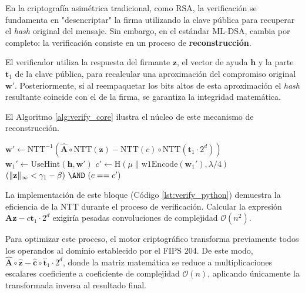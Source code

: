 \documentclass[11pt, a4paper]{report}
\theoremstyle{definition}
\begin{document}
En la criptografía asimétrica tradicional, como RSA, la verificación se fundamenta en "desencriptar" la firma utilizando la clave pública para recuperar el \textit{hash} original del mensaje. Sin embargo, en el estándar ML-DSA, cambia por completo: la verificación consiste en un proceso de \textbf{reconstrucción}.

El verificador utiliza la respuesta del firmante $\mathbf{z}$, el vector de ayuda $\mathbf{h}$ y la parte $\mathbf{t}_1$ de la clave pública, para recalcular una aproximación del compromiso original $\mathbf{w}'$. Posteriormente, si al reempaquetar los bits altos de esta aproximación el \textit{hash} resultante coincide con el de la firma, se garantiza la integridad matemática.

El Algoritmo \ref{alg:verify_core} ilustra el núcleo de este mecanismo de reconstrucción.

\begin{algorithm}[H]
\caption{Fragmento Algoritmo 8: Reconstrucción y Verificación}
\label{alg:verify_core}
\begin{algorithmic}[9]
\STATE $\mathbf{w}' \gets \text{NTT}^{-1}(\mathbf{\hat{A}} \circ \text{NTT}(\mathbf{z}) - \text{NTT}(c) \circ \text{NTT}(\mathbf{t}_1 \cdot 2^d))$
\STATE $\mathbf{w}_1' \gets \text{UseHint}(\mathbf{h}, \mathbf{w}')$ 
\STATE $c' \gets \text{H}(\mu \parallel \text{w1Encode}(\mathbf{w}_1'), \lambda/4)$ 
\RETURN $(\|\mathbf{z}\|_\infty < \gamma_1 - \beta) \text{ \AND } (c == c')$
\end{algorithmic}
\end{algorithm}

La implementación de este bloque (Código \ref{lst:verify_python}) demuestra la eficiencia de la NTT durante el proceso de verificación. Calcular la expresión $\mathbf{A}\mathbf{z} - c\mathbf{t}_1 \cdot 2^d$ exigiría pesadas convoluciones de complejidad $\mathcal{O}(n^2)$. 

Para optimizar este proceso, el motor criptográfico transforma previamente todos los operandos al dominio establecido por el FIPS 204. De este modo, $\mathbf{\hat{A}} \circ \mathbf{\hat{z}} - \mathbf{\hat{c}} \circ \mathbf{\hat{t}}_1 \cdot 2^d$, donde la matriz matemática se reduce a multiplicaciones escalares coeficiente a coeficiente de complejidad $\mathcal{O}(n)$, aplicando únicamente la transformada inversa al resultado final.\vspace{0.3cm}
\end{document}
